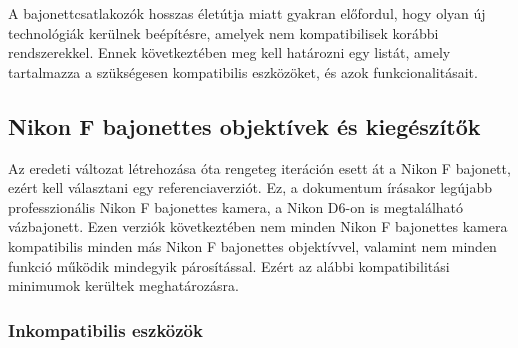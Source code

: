 \def\checkmark{\tikz\fill[scale=0.4](0,.25) -- (.25,0) -- (1,.7) -- (.25,.15) -- cycle;}

A bajonettcsatlakozók hosszas életútja miatt gyakran előfordul, hogy olyan új technológiák kerülnek beépítésre, amelyek nem kompatibilisek korábbi rendszerekkel. Ennek következtében meg kell határozni egy listát, amely tartalmazza a szükségesen kompatibilis eszközöket, és azok funkcionalitásait.

\subsection{Nikon F bajonettes objektívek és kiegészítők}

Az eredeti változat létrehozása óta rengeteg iteráción esett át a Nikon F bajonett, ezért kell választani egy referenciaverziót. Ez, a dokumentum írásakor legújabb professzionális Nikon F bajonettes kamera, a Nikon D6-on is megtalálható vázbajonett. Ezen verziók következtében nem minden Nikon F bajonettes kamera kompatibilis minden más Nikon F bajonettes objektívvel, valamint nem minden funkció működik mindegyik párosítással. Ezért az alábbi kompatibilitási minimumok kerültek meghatározásra. 

\subsubsection{Inkompatibilis eszközök}

